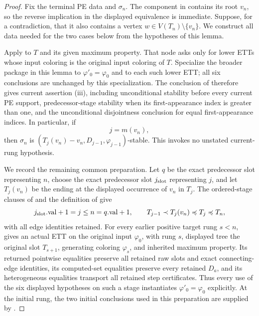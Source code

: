 \begin{proof}
Fix the terminal PE data and \(\sigma_n\).  The component in
 contains its root \(v_n\), so the reverse
implication in the displayed equivalence is immediate.  Suppose, for a
contradiction, that it also contains a vertex
\(w\in V(T_n)\setminus\{v_n\}\).  We construct all data needed for the
two cases below from the hypotheses of this lemma.

Apply  to \(T\) and its given maximum property.
That node asks only for lower ETTs whose input coloring is the original
input coloring of \(T\).  Specialize the broader package in this lemma to
\(\varphi'_0=\varphi_0\) and to each such lower ETT; all six conclusions
are unchanged by this specialization.  The conclusion of
 therefore gives current assertion (iii), including
unconditional stability before every current PE support, predecessor-stage
stability when its first-appearance index is greater than one, and the
unconditional disjointness conclusion for equal first-appearance indices.  In particular, if
\[
                         j=m(v_n),
\]
then \(\sigma_n\) is
\((T_j(v_n)-v_n,D_{j-1},\varphi_{j-1})\)-stable.  This invokes no
unstated current-rung hypothesis.

We record the remaining common preparation.  Let \(q\) be the exact
predecessor slot representing \(n\), choose the exact predecessor slot
\(j_{\rm slot}\) representing \(j\), and let
\(T_j(v_n)\) be the  ending at the displayed
occurrence of \(v_n\) in \(T_j\).  The ordered-stage clauses of
 and the definition of
 give
\[
 j_{\rm slot}.\mathrm{val}+1=j\leq n=q.\mathrm{val}+1,
 \qquad T_{j-1}\prec T_j(v_n)\preccurlyeq T_j\preccurlyeq T_n,
\]
with all edge identities retained.  For every earlier positive target
rung \(s<n\),  gives an actual ETT on
the original input \(\varphi_0\), with rung \(s\), displayed tree the
original slot \(T_{s+1}\), generating coloring \(\varphi_s\), and
inherited maximum property.  Its returned pointwise equalities preserve
all retained raw slots and exact connecting-edge identities, its
computed-set equalities preserve every retained \(D_a\), and its
heterogeneous equalities transport all retained step certificates.  Thus
every use of the six displayed hypotheses on such a stage instantiates
\(\varphi'_0=\varphi_0\) explicitly.
At the initial rung, the two initial conclusions used in this preparation
are supplied by .


\end{proof}
